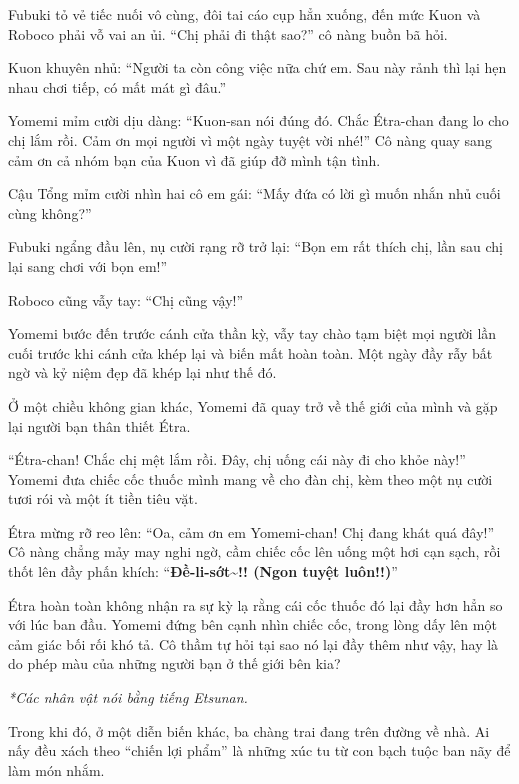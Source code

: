 \documentclass[../main.tex]{subfiles}
\begin{document}
Fubuki tỏ vẻ tiếc nuối vô cùng, đôi tai cáo cụp hẳn xuống, đến mức Kuon và Roboco phải vỗ vai an ủi.
``Chị phải đi thật sao?'' cô nàng buồn bã hỏi.

Kuon khuyên nhủ: ``Người ta còn công việc nữa chứ em. Sau này rảnh thì lại hẹn nhau chơi tiếp, có mất mát gì đâu.''

Yomemi mỉm cười dịu dàng: ``Kuon-san nói đúng đó. Chắc Étra-chan đang lo cho chị lắm rồi. Cảm ơn mọi người vì một ngày tuyệt vời nhé!'' Cô nàng quay sang cảm ơn cả nhóm bạn của Kuon vì đã giúp đỡ mình tận tình.

Cậu Tổng mỉm cười nhìn hai cô em gái: ``Mấy đứa có lời gì muốn nhắn nhủ cuối cùng không?''

Fubuki ngẩng đầu lên, nụ cười rạng rỡ trở lại: ``Bọn em rất thích chị, lần sau chị lại sang chơi với bọn em!''

Roboco cũng vẫy tay: ``Chị cũng vậy!''

Yomemi bước đến trước cánh cửa thần kỳ, vẫy tay chào tạm biệt mọi người lần cuối trước khi cánh cửa khép lại và biến mất hoàn toàn. Một ngày đầy rẫy bất ngờ và kỷ niệm đẹp đã khép lại như thế đó.

\omk

Ở một chiều không gian khác, Yomemi đã quay trở về thế giới của mình và gặp lại người bạn thân thiết Étra.

``Étra-chan! Chắc chị mệt lắm rồi. Đây, chị uống cái này đi cho khỏe này!'' Yomemi đưa chiếc cốc thuốc mình mang về cho đàn chị, kèm theo một nụ cười tươi rói và một ít tiền tiêu vặt.

Étra mừng rỡ reo lên: ``Oa, cảm ơn em Yomemi-chan! Chị đang khát quá đây!'' Cô nàng chẳng mảy may nghi ngờ, cầm chiếc cốc lên uống một hơi cạn sạch, rồi thốt lên đầy phấn khích: ``\textbf{Đề-li-sớt\~{}!! (Ngon tuyệt luôn!!)}''

Étra hoàn toàn không nhận ra sự kỳ lạ rằng cái cốc thuốc đó lại đầy hơn hẳn so với lúc ban đầu. Yomemi đứng bên cạnh nhìn chiếc cốc, trong lòng dấy lên một cảm giác bối rối khó tả. Cô thầm tự hỏi tại sao nó lại đầy thêm như vậy, hay là do phép màu của những người bạn ở thế giới bên kia?

\il

\begin{center}
  {\textit{*Các nhân vật nói bằng tiếng Etsunan.}}
\end{center}

Trong khi đó, ở một diễn biến khác, ba chàng trai đang trên đường về nhà. Ai nấy đều xách theo ``chiến lợi phẩm'' là những xúc tu từ con bạch tuộc ban nãy để làm món nhắm.
\end{document}
